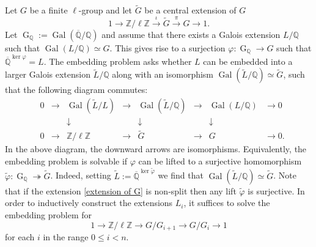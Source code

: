 \documentclass[11pt,reqno]{amsart}
\newcommand{\Z}{\mathbb{Z}}
\newcommand{\Q}{\mathbb{Q}}
\newcommand{\op}[1]{\operatorname{#1}}
\numberwithin{equation}{section}
\begin{document}
Let $G$ be a finite $\ell$-group and let $\widetilde{G}$ be a central extension of $G$
\begin{equation}\label{extension of G}1\to \Z/\ell\Z\xrightarrow{\iota} \widetilde{G} \xrightarrow{\pi} G\rightarrow 1.\end{equation} Let $\op{G}_{\Q}:=\op{Gal}(\overline{\Q}/\Q)$ and assume that there exists a Galois extension $L/\Q$ such that ${\op{Gal}(L/\Q)\simeq G}$. This gives rise to a surjection $\varphi:\op{G}_{\Q}\rightarrow G$ such that $\overline{\Q}^{\op{ker}\varphi}=L$. The embedding problem asks whether $L$ can be embedded into a larger Galois extension $\widetilde{L}/\Q$ along with an isomorphism $\op{Gal}(\widetilde{L}/\Q)\simeq \widetilde{G}$, such that the following diagram commutes:
\[
\begin{array}{ccccccccc}
 & 0 & \to & \op{Gal}(\widetilde{L}/L) & \to & \op{Gal}(\widetilde{L}/\Q) & \to & \op{Gal}(L/\Q) & \to 0 \\
 &   &     & \downarrow &   & \downarrow &   & \downarrow &  \\
 & 0 & \to & \Z/\ell \Z  & \to & \widetilde{G}  & \to & G  & \to 0.
\end{array}
\]
In the above diagram, the downward arrows are isomorphisms. Equivalently, the embedding problem is solvable if $\varphi$ can be lifted to a surjective homomorphism $\widetilde{\varphi}: \op{G}_\Q\twoheadrightarrow \widetilde{G}$. Indeed, setting $\widetilde{L}:=\overline{\Q}^{\op{ker}\widetilde{\varphi}}$ we find that $\op{Gal}(\widetilde{L}/\Q)\simeq \widetilde{G}$. Note that if the extension \eqref{extension of G} is non-split then any lift $\widetilde{\varphi}$ is surjective. In order to inductively construct the extensions $L_i$, it suffices to solve the embedding problem for 
\[1\rightarrow \Z/\ell \Z\rightarrow G/G_{i+1}\rightarrow G/G_i\rightarrow 1\] for each $i$ in the range $0\leq i <n$. \\
\end{document}
